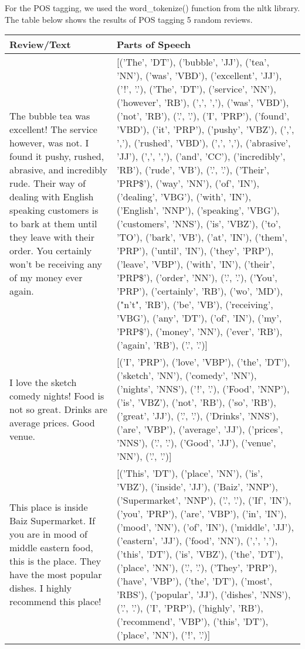 For the POS tagging, we used the word\_tokenize() function from the nltk library. The table below shows the results of POS tagging 5 random reviews.

\setlength{\tabcolsep}{18pt}
\renewcommand{\arraystretch}{1.75}
    \begin{longtable}{|| p{3cm} | p{3cm} ||} 
        \hline 
         \textbf{Review/Text} & \textbf{Parts of Speech} \\ [0.5ex] 
         \hline\hline
         The bubble tea was excellent! The service however, was not. I found it pushy, rushed, abrasive, and incredibly rude. Their way of dealing with English speaking customers is to bark at them until they leave with their order. You certainly won't be receiving any of my money ever again. & [('The', 'DT'), ('bubble', 'JJ'), ('tea', 'NN'), ('was', 'VBD'), ('excellent', 'JJ'), ('!', '.'), ('The', 'DT'), ('service', 'NN'), ('however', 'RB'), (',', ','), ('was', 'VBD'), ('not', 'RB'), ('.', '.'), ('I', 'PRP'), ('found', 'VBD'), ('it', 'PRP'), ('pushy', 'VBZ'), (',', ','), ('rushed', 'VBD'), (',', ','), ('abrasive', 'JJ'), (',', ','), ('and', 'CC'), ('incredibly', 'RB'), ('rude', 'VB'), ('.', '.'), ('Their', 'PRP\$'), ('way', 'NN'), ('of', 'IN'), ('dealing', 'VBG'), ('with', 'IN'), ('English', 'NNP'), ('speaking', 'VBG'), ('customers', 'NNS'), ('is', 'VBZ'), ('to', 'TO'), ('bark', 'VB'), ('at', 'IN'), ('them', 'PRP'), ('until', 'IN'), ('they', 'PRP'), ('leave', 'VBP'), ('with', 'IN'), ('their', 'PRP\$'), ('order', 'NN'), ('.', '.'), ('You', 'PRP'), ('certainly', 'RB'), ('wo', 'MD'), ("n't", 'RB'), ('be', 'VB'), ('receiving', 'VBG'), ('any', 'DT'), ('of', 'IN'), ('my', 'PRP\$'), ('money', 'NN'), ('ever', 'RB'), ('again', 'RB'), ('.', '.')] \\ 
         \hline
         I love the sketch comedy nights! Food is not so great. Drinks are average prices. Good venue. & [('I', 'PRP'), ('love', 'VBP'), ('the', 'DT'), ('sketch', 'NN'), ('comedy', 'NN'), ('nights', 'NNS'), ('!', '.'), ('Food', 'NNP'), ('is', 'VBZ'), ('not', 'RB'), ('so', 'RB'), ('great', 'JJ'), ('.', '.'), ('Drinks', 'NNS'), ('are', 'VBP'), ('average', 'JJ'), ('prices', 'NNS'), ('.', '.'), ('Good', 'JJ'), ('venue', 'NN'), ('.', '.')] \\
         \hline
         This place is inside Baiz Supermarket. If you are in mood of middle eastern food, this is the place. They have the most popular dishes. I highly recommend this place! & [('This', 'DT'), ('place', 'NN'), ('is', 'VBZ'), ('inside', 'JJ'), ('Baiz', 'NNP'), ('Supermarket', 'NNP'), ('.', '.'), ('If', 'IN'), ('you', 'PRP'), ('are', 'VBP'), ('in', 'IN'), ('mood', 'NN'), ('of', 'IN'), ('middle', 'JJ'), ('eastern', 'JJ'), ('food', 'NN'), (',', ','), ('this', 'DT'), ('is', 'VBZ'), ('the', 'DT'), ('place', 'NN'), ('.', '.'), ('They', 'PRP'), ('have', 'VBP'), ('the', 'DT'), ('most', 'RBS'), ('popular', 'JJ'), ('dishes', 'NNS'), ('.', '.'), ('I', 'PRP'), ('highly', 'RB'), ('recommend', 'VBP'), ('this', 'DT'), ('place', 'NN'), ('!', '.')] \\

\end{longtable}
